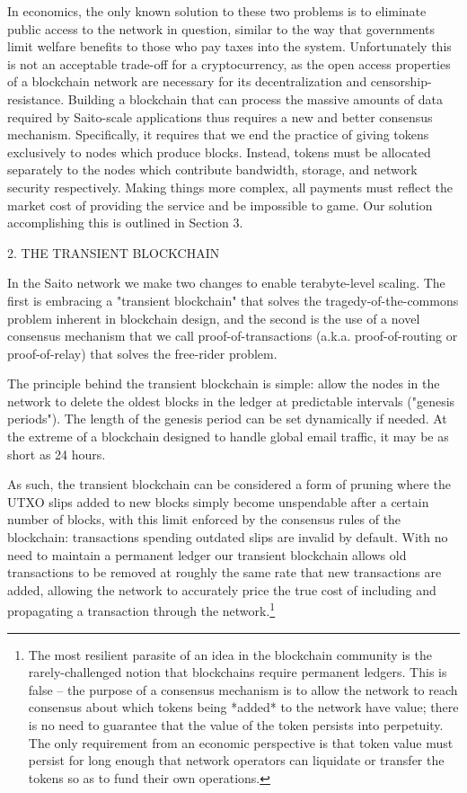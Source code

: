 \documentclass[11.5pt, oneside]{article}   	%
\begin{document}
\begin{multicols}{2}
In economics, the only known solution to these two problems is to eliminate public access to the network in question, similar to the way that governments limit welfare benefits to those who pay taxes into the system. Unfortunately this is not an acceptable trade-off for a cryptocurrency, as the open access properties of a blockchain network are necessary for its decentralization and censorship-resistance. Building a blockchain that can process the massive amounts of data required by Saito-scale applications thus requires a new and better consensus mechanism. Specifically, it requires that we end the practice of giving tokens exclusively to nodes which produce blocks. Instead, tokens must be allocated separately to the nodes which contribute bandwidth, storage, and network security respectively. Making things more complex, all payments must reflect the market cost of providing the service and be impossible to game. Our solution accomplishing this is outlined in Section 3.

2. THE TRANSIENT BLOCKCHAIN

In the Saito network we make two changes to enable terabyte-level scaling. The first is embracing a "transient blockchain" that solves the tragedy-of-the-commons problem inherent in blockchain design, and the second is the use of a novel consensus mechanism that we call proof-of-transactions (a.k.a. proof-of-routing or proof-of-relay) that solves the free-rider problem. 

The principle behind the transient blockchain is simple: allow the nodes in the network to delete the oldest blocks in the ledger at predictable intervals ("genesis periods"). The length of the genesis period can be set dynamically if needed. At the extreme of a blockchain designed to handle global email traffic, it may be as short as 24 hours.

As such, the transient blockchain can be considered a form of pruning where the UTXO slips added to new blocks simply become unspendable after a certain number of blocks, with this limit enforced by the consensus rules of the blockchain: transactions spending outdated slips are invalid by default. With no need to maintain a permanent ledger our transient blockchain allows old transactions to be removed at roughly the same rate that new transactions are added, allowing the network to accurately price the true cost of including and propagating a transaction through the network.\footnote[1]{The most resilient parasite of an idea in the blockchain community is the rarely-challenged notion that blockchains require permanent ledgers. This is false -- the purpose of a consensus mechanism is to allow the network to reach consensus about which tokens being *added* to the network have value; there is no need to guarantee that the value of the token persists into perpetuity. The only requirement from an economic perspective is that token value must persist for long enough that network operators can liquidate or transfer the tokens so as to fund their own operations.}


\end{multicols}
\end{document}
